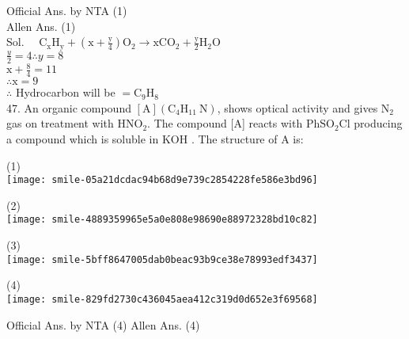 \documentclass[10pt]{article}
\begin{document}
Official Ans. by NTA (1)\\
Allen Ans. (1)\\
Sol. \(\quad \mathrm{C}_{\mathrm{x}} \mathrm{H}_{\mathrm{y}}+\left(\mathrm{x}+\frac{\mathrm{y}}{4}\right) \mathrm{O}_{2} \rightarrow \mathrm{xCO}_{2}+\frac{\mathrm{y}}{2} \mathrm{H}_{2} \mathrm{O}\)\\
\(\frac{y}{2}=4 \therefore y=8\)\\
\(\mathrm{x}+\frac{8}{4}=11\)\\
\(\therefore \mathrm{x}=9\)\\
\(\therefore\) Hydrocarbon will be \(=\mathrm{C}_{9} \mathrm{H}_{8}\)\\
47. An organic compound \([\mathrm{A}]\left(\mathrm{C}_{4} \mathrm{H}_{11} \mathrm{~N}\right)\), shows optical activity and gives \(\mathrm{N}_{2}\) gas on treatment with \(\mathrm{HNO}_{2}\). The compound [A] reacts with \(\mathrm{PhSO}_{2} \mathrm{Cl}\) producing a compound which is soluble in KOH . The structure of A is:

(1)\\
\texttt{[image: smile-05a21dcdac94b68d9e739c2854228fe586e3bd96]}

(2)\\
\texttt{[image: smile-4889359965e5a0e808e98690e88972328bd10c82]}

(3)\\
\texttt{[image: smile-5bff8647005dab0beac93b9ce38e78993edf3437]}

(4)\\
\texttt{[image: smile-829fd2730c436045aea412c319d0d652e3f69568]}

Official Ans. by NTA (4) Allen Ans. (4)
\end{document}
